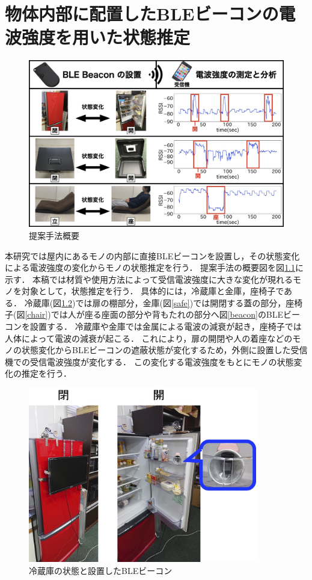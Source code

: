 \chapter{物体内部に配置したBLEビーコンの電波強度を用いた状態推定}
\thispagestyle{myheadings}

\begin{figure}[tbh]
    \centering
    \includegraphics[width=14cm]{images/chapter3/abst.jpg}
    \caption{提案手法概要}
    \label{abst-chap3}
\end{figure}

本研究では屋内にあるモノの内部に直接BLEビーコンを設置し，その状態変化による電波強度の変化からモノの状態推定を行う．
提案手法の概要図を図\ref{abst-chap3}に示す．
本稿では材質や使用方法によって受信電波強度に大きな変化が現れるモノを対象として，状態推定を行う．
具体的には，冷蔵庫と金庫，座椅子である．
冷蔵庫(図\ref{freezer})では扉の棚部分，金庫(図\ref{safe})では開閉する蓋の部分，座椅子(図\ref{chair})では人が座る座面の部分や背もたれの部分へ図\ref{beacon}のBLEビーコンを設置する．
冷蔵庫や金庫では金属による電波の減衰が起き，座椅子では人体によって電波の減衰が起こる．
これにより，扉の開閉や人の着座などのモノの状態変化からBLEビーコンの遮蔽状態が変化するため，外側に設置した受信機での受信電波強度が変化する．
この変化する電波強度をもとにモノの状態変化の推定を行う．



\begin{figure}[H]
    \centering
    \includegraphics[width=10cm]{images/chapter3/regisW2.jpg}
    \caption{冷蔵庫の状態と設置したBLEビーコン}
    \label{freezer}
\end{figure}


